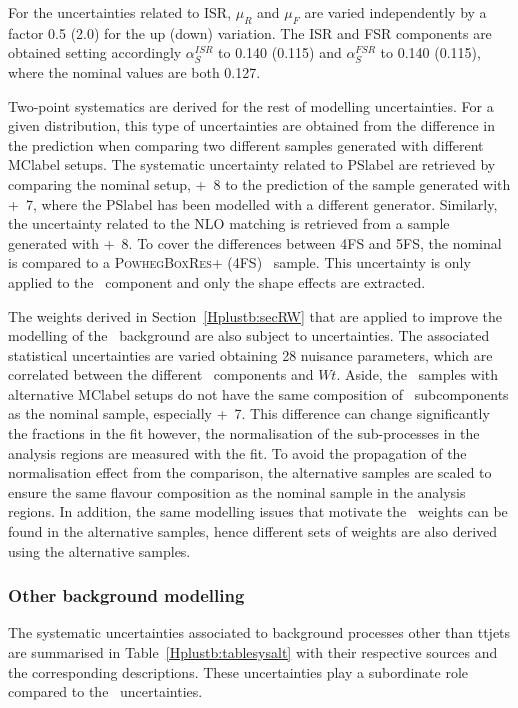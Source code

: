 For the uncertainties related to ISR, $\mu_R$ and $\mu_F$ are varied independently by a factor 0.5 (2.0) for the up (down) variation. The ISR and FSR components are obtained setting accordingly $\alpha_S^{ISR}$ to 0.140 (0.115) and $\alpha_S^{FSR}$ to 0.140 (0.115), where the nominal values are both 0.127.

Two-point systematics are derived for the rest of modelling uncertainties. For a given distribution, this type of uncertainties are obtained from the difference in the prediction when comparing two different samples generated with different \acrshort{MClabel} setups. The systematic uncertainty related to \acrshort{PSlabel} are retrieved by comparing the nominal setup, \POWHEGBOX+\PYTHIA~8 to the prediction of the sample generated with \POWHEGBOX+\HERWIG~7, where the \acrshort{PSlabel} has been modelled with a different generator. Similarly, the uncertainty related to the NLO matching is retrieved from a sample generated with \MGMCatNLO+\PYTHIA~8. 
To cover the differences between 4FS and 5FS, the nominal is compared to a \textsc{PowhegBoxRes}+ (4FS) \ttb\ sample. This uncertainty is only applied to the \ttb\ component and only the shape effects are extracted.

The weights derived in Section~\ref{Hplustb:secRW} that are applied to improve the modelling of the \ttbar\ background are also subject to uncertainties. The associated statistical uncertainties are varied obtaining 28 nuisance parameters, which are correlated between the different \ttbar\ components and $Wt$. Aside, the \ttbar\ samples with alternative \acrshort{MClabel} setups do not have the same composition of \ttbar\ subcomponents as the nominal sample, especially \POWHEGBOX+\HERWIG~7. This difference can change significantly the fractions in the fit however, the normalisation of the sub-processes in the analysis regions are measured with the fit. To avoid the propagation of the normalisation effect from the comparison, the alternative samples are scaled to ensure the same flavour composition as the nominal sample in the analysis regions. In addition, the same modelling issues that motivate the \ttbar\ weights can be found in the alternative samples, hence different sets of weights are also derived using the alternative samples.

\subsubsection{Other background modelling}
The systematic uncertainties associated to background processes other than ttjets are summarised in Table~\ref{Hplustb:tablesysalt} with their respective sources and the corresponding descriptions. These uncertainties play a subordinate role compared to the \ttbar\ uncertainties.

